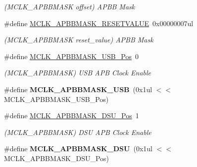 \begin{DoxyCompactItemize}
\begin{DoxyCompactList}\small\item\em (M\+C\+L\+K\+\_\+\+A\+P\+B\+B\+M\+A\+S\+K offset) A\+P\+B\+B Mask \end{DoxyCompactList}\item 
\hypertarget{group___s_a_m_l21___m_c_l_k_ga7784f1cdd1314b91b3004070e1fc4b8b}{}\#define \hyperlink{group___s_a_m_l21___m_c_l_k_ga7784f1cdd1314b91b3004070e1fc4b8b}{M\+C\+L\+K\+\_\+\+A\+P\+B\+B\+M\+A\+S\+K\+\_\+\+R\+E\+S\+E\+T\+V\+A\+L\+U\+E}~0x00000007ul\label{group___s_a_m_l21___m_c_l_k_ga7784f1cdd1314b91b3004070e1fc4b8b}

\begin{DoxyCompactList}\small\item\em (M\+C\+L\+K\+\_\+\+A\+P\+B\+B\+M\+A\+S\+K reset\+\_\+value) A\+P\+B\+B Mask \end{DoxyCompactList}\item 
\hypertarget{group___s_a_m_l21___m_c_l_k_gaf21d2c3cd0e5edba8c2ad9db99d97a37}{}\#define \hyperlink{group___s_a_m_l21___m_c_l_k_gaf21d2c3cd0e5edba8c2ad9db99d97a37}{M\+C\+L\+K\+\_\+\+A\+P\+B\+B\+M\+A\+S\+K\+\_\+\+U\+S\+B\+\_\+\+Pos}~0\label{group___s_a_m_l21___m_c_l_k_gaf21d2c3cd0e5edba8c2ad9db99d97a37}

\begin{DoxyCompactList}\small\item\em (M\+C\+L\+K\+\_\+\+A\+P\+B\+B\+M\+A\+S\+K) U\+S\+B A\+P\+B Clock Enable \end{DoxyCompactList}\item 
\hypertarget{group___s_a_m_l21___m_c_l_k_gaaf842d3fb3e5253ed4f5aa5022143020}{}\#define {\bfseries M\+C\+L\+K\+\_\+\+A\+P\+B\+B\+M\+A\+S\+K\+\_\+\+U\+S\+B}~(0x1ul $<$$<$ M\+C\+L\+K\+\_\+\+A\+P\+B\+B\+M\+A\+S\+K\+\_\+\+U\+S\+B\+\_\+\+Pos)\label{group___s_a_m_l21___m_c_l_k_gaaf842d3fb3e5253ed4f5aa5022143020}

\item 
\hypertarget{group___s_a_m_l21___m_c_l_k_ga04d6d13ad8ea21c5493c88e22b64900b}{}\#define \hyperlink{group___s_a_m_l21___m_c_l_k_ga04d6d13ad8ea21c5493c88e22b64900b}{M\+C\+L\+K\+\_\+\+A\+P\+B\+B\+M\+A\+S\+K\+\_\+\+D\+S\+U\+\_\+\+Pos}~1\label{group___s_a_m_l21___m_c_l_k_ga04d6d13ad8ea21c5493c88e22b64900b}

\begin{DoxyCompactList}\small\item\em (M\+C\+L\+K\+\_\+\+A\+P\+B\+B\+M\+A\+S\+K) D\+S\+U A\+P\+B Clock Enable \end{DoxyCompactList}\item 
\hypertarget{group___s_a_m_l21___m_c_l_k_gab5389d85bf558511dcf954f5e2eb47a2}{}\#define {\bfseries M\+C\+L\+K\+\_\+\+A\+P\+B\+B\+M\+A\+S\+K\+\_\+\+D\+S\+U}~(0x1ul $<$$<$ M\+C\+L\+K\+\_\+\+A\+P\+B\+B\+M\+A\+S\+K\+\_\+\+D\+S\+U\+\_\+\+Pos)\label{group___s_a_m_l21___m_c_l_k_gab5389d85bf558511dcf954f5e2eb47a2}


\end{DoxyCompactItemize}
